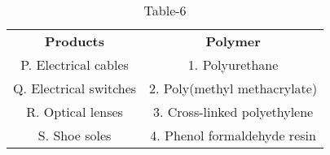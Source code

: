 \begin{table}[htbp]
  \centering
  \caption{Table-6}
  \label{tab:tables/table6.tex}
  \begin{tabular}{cc}
\textbf{Products} & \textbf{Polymer}\\

P. Electrical cables & 1. Polyurethane \\
Q. Electrical switches & 2. Poly(methyl methacrylate) \\
R. Optical lenses & 3. Cross-linked polyethylene \\
S. Shoe soles & 4. Phenol formaldehyde resin \\
  
  
  
  \end{tabular}
\end{table}